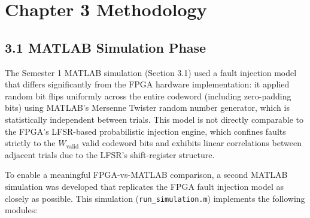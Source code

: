 \documentclass[
  12pt,
  a4paper]{report}
\begin{document}
\chapter{Chapter 3 Methodology}\label{chapter-3-methodology}

\section{3.1 MATLAB Simulation Phase}\label{matlab-simulation-phase}

The Semester 1 MATLAB simulation (Section 3.1) used a fault injection
model that differs significantly from the FPGA hardware implementation:
it applied random bit flips uniformly across the entire codeword
(including zero-padding bits) using MATLAB's Mersenne Twister random
number generator, which is statistically independent between trials.
This model is not directly comparable to the FPGA's LFSR-based
probabilistic injection engine, which confines faults strictly to the
\(W_{\text{valid}}\) valid codeword bits and exhibits linear
correlations between adjacent trials due to the LFSR's shift-register
structure.

To enable a meaningful FPGA-vs-MATLAB comparison, a second MATLAB
simulation was developed that replicates the FPGA fault injection model
as closely as possible. This simulation (\texttt{run\_simulation.m})
implements the following modules:
\end{document}
